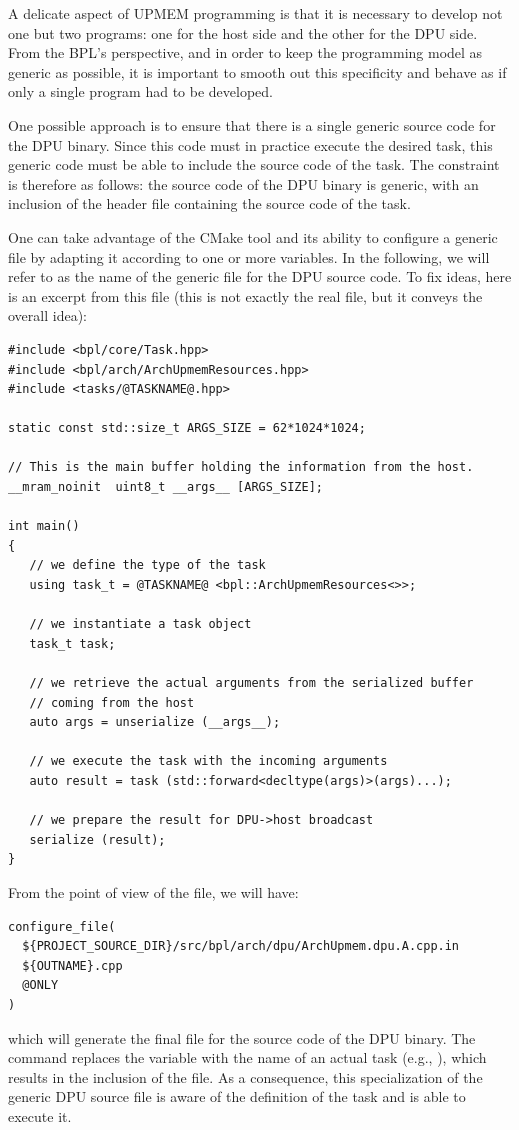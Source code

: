 A delicate aspect of UPMEM programming is that it is necessary to develop not one but two programs: one for the host side 
and the other for the DPU side. From the BPL’s perspective, and in order to keep the programming model as generic as possible, 
it is important to smooth out this specificity and behave as if only a single program had to be developed.

One possible approach is to ensure that there is a single generic source code for the DPU binary. Since this code must in 
practice execute the desired task, this generic code must be able to include the source code of the task. The constraint is 
therefore as follows: the source code of the DPU binary is generic, with an inclusion of the header file containing the 
source code of the task.

One can take advantage of the CMake tool and its ability to configure a generic file by adapting it according to one 
or more variables. In the following, we will refer to  as the name of the generic file for the 
DPU source code. To fix ideas, here is an excerpt from this file (this is not exactly the real file, but it conveys 
the overall idea):

\begin{verbatim}
#include <bpl/core/Task.hpp>
#include <bpl/arch/ArchUpmemResources.hpp>
#include <tasks/@TASKNAME@.hpp>

static const std::size_t ARGS_SIZE = 62*1024*1024;

// This is the main buffer holding the information from the host.
__mram_noinit  uint8_t __args__ [ARGS_SIZE];

int main() 
{
   // we define the type of the task 
   using task_t = @TASKNAME@ <bpl::ArchUpmemResources<>>;
	
   // we instantiate a task object
   task_t task;

   // we retrieve the actual arguments from the serialized buffer 
   // coming from the host
   auto args = unserialize (__args__);

   // we execute the task with the incoming arguments
   auto result = task (std::forward<decltype(args)>(args)...);	
   
   // we prepare the result for DPU->host broadcast
   serialize (result);
}
\end{verbatim}

From the point of view of the  file, we will have:
\begin{verbatim}
configure_file(
  ${PROJECT_SOURCE_DIR}/src/bpl/arch/dpu/ArchUpmem.dpu.A.cpp.in
  ${OUTNAME}.cpp
  @ONLY
)
\end{verbatim}
which will generate the final  file for the source code of the DPU binary. 
The  command replaces the  variable with the name of an actual task 
(e.g., ), which results in the inclusion of the  file. 
As a consequence, this specialization of the generic DPU source file is aware of the definition of the 
 task and is able to execute it.


